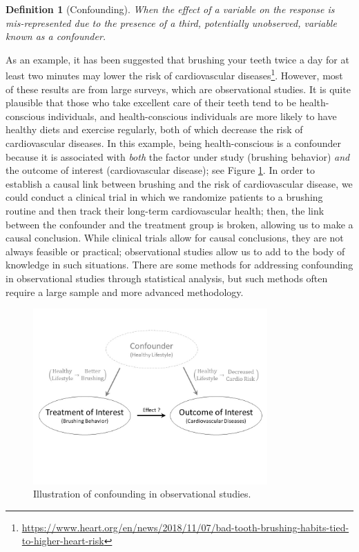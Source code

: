 \documentclass[
]{book}
\theoremstyle{plain}
\theoremstyle{mydefn}
\newtheorem{definition}{Definition}[chapter]
\theoremstyle{myexmpl}
\theoremstyle{remark}
\begin{document}
\begin{definition}[Confounding]
\protect\hypertarget{def:defn-confounding}{}{\label{def:defn-confounding} {} }When the effect of a variable on the response is mis-represented due to the presence of a third, potentially unobserved, variable known as a confounder.
\end{definition}

As an example, it has been suggested that brushing your teeth twice a day for at least two minutes may lower the risk of cardiovascular diseases\footnote{\url{https://www.heart.org/en/news/2018/11/07/bad-tooth-brushing-habits-tied-to-higher-heart-risk}}. However, most of these results are from large surveys, which are observational studies. It is quite plausible that those who take excellent care of their teeth tend to be health-conscious individuals, and health-conscious individuals are more likely to have healthy diets and exercise regularly, both of which decrease the risk of cardiovascular diseases. In this example, being health-conscious is a confounder because it is associated with \emph{both} the factor under study (brushing behavior) \emph{and} the outcome of interest (cardiovascular disease); see Figure \ref{fig:statistical-process-confounding}. In order to establish a causal link between brushing and the risk of cardiovascular disease, we could conduct a clinical trial in which we randomize patients to a brushing routine and then track their long-term cardiovascular health; then, the link between the confounder and the treatment group is broken, allowing us to make a causal conclusion. While clinical trials allow for causal conclusions, they are not always feasible or practical; observational studies allow us to add to the body of knowledge in such situations. There are some methods for addressing confounding in observational studies through statistical analysis, but such methods often require a large sample and more advanced methodology.

\begin{figure}

{\centering \includegraphics[width=0.8\textwidth]{images/Statistical-Process-Confounding} 

}

\caption{Illustration of confounding in observational studies.}\label{fig:statistical-process-confounding}
\end{figure}
\end{document}
